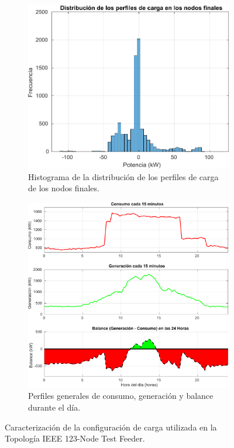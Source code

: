 \begin{figure}[ht!]
    \centering
    \begin{subfigure}{0.45\textwidth}
        \centering
        \includegraphics[width=\textwidth]{fig/07_bloste/bloste_06a.pdf}
        \caption{Histograma de la distribución de los perfiles de carga de los nodos finales.}
        \label{fig:loadsHist}
    \end{subfigure} \hspace{0.05\textwidth}
    \begin{subfigure}{0.45\textwidth}
        \centering
        \includegraphics[width=\textwidth]{fig/07_bloste/bloste_06b.pdf}
        \caption{Perfiles generales de consumo, generación y balance durante el día.}
        \label{fig:loads_global_view}
    \end{subfigure}
    \caption{Caracterización de la configuración de carga utilizada en la Topología IEEE 123-Node Test Feeder.}
\end{figure}

